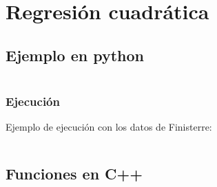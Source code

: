 \chapter{Regresión cuadrática}
\label{appendix:regresion_cuadratica}

\section{Ejemplo en python}

\inputminted{python}{apendices/regresion_cuadratica.py}

\subsection{Ejecución}

Ejemplo de ejecución con los datos de Finisterre:

\inputminted{text}{apendices/reg_ft_2014.txt}

\section{Funciones en C++}

\inputminted{c++}{apendices/reg2.h}
